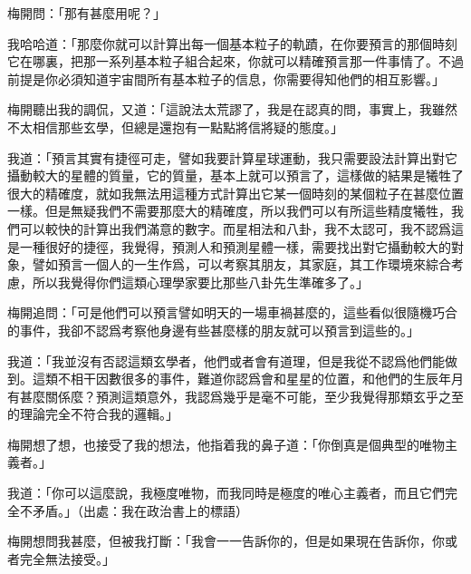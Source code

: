 梅開問：「那有甚麼用呢？」

我哈哈道：「那麼你就可以計算出每一個基本粒子的軌蹟，在你要預言的那個時刻它在哪裏，把那一系列基本粒子組合起來，你就可以精確預言那一件事情了。不過前提是你必須知道宇宙間所有基本粒子的信息，你需要得知他們的相互影響。」


梅開聽出我的調侃，又道：「這說法太荒謬了，我是在認真的問，事實上，我雖然不太相信那些玄學，但總是還抱有一點點將信將疑的態度。」

我道：「預言其實有捷徑可走，譬如我要計算星球運動，我只需要設法計算出對它攝動較大的星體的質量，它的質量，基本上就可以預言了，這樣做的結果是犧牲了很大的精確度，就如我無法用這種方式計算出它某一個時刻的某個粒子在甚麼位置一樣。但是無疑我們不需要那麼大的精確度，所以我們可以有所這些精度犧牲，我們可以較快的計算出我們滿意的數字。而星相法和八卦，我不太認可，我不認爲這是一種很好的捷徑，我覺得，預測人和預測星體一樣，需要找出對它攝動較大的對象，譬如預言一個人的一生作爲，可以考察其朋友，其家庭，其工作環境來綜合考慮，所以我覺得你們這類心理學家要比那些八卦先生準確多了。」

梅開追問：「可是他們可以預言譬如明天的一場車禍甚麼的，這些看似很隨機巧合的事件，我卻不認爲考察他身邊有些甚麼樣的朋友就可以預言到這些的。」

我道：「我並沒有否認這類玄學者，他們或者會有道理，但是我從不認爲他們能做到。這類不相干因數很多的事件，難道你認爲會和星星的位置，和他們的生辰年月有甚麼關係麼？預測這類意外，我認爲幾乎是毫不可能，至少我覺得那類玄乎之至的理論完全不符合我的邏輯。」

梅開想了想，也接受了我的想法，他指着我的鼻子道：「你倒真是個典型的唯物主義者。」

我道：「你可以這麼說，我極度唯物，而我同時是極度的唯心主義者，而且它們完全不矛盾。」（出處：我在政治書上的標語）

梅開想問我甚麼，但被我打斷：「我會一一告訴你的，但是如果現在告訴你，你或者完全無法接受。」

